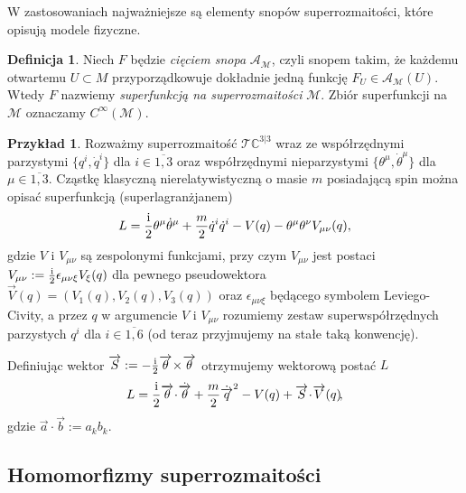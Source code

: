 \documentclass[11pt,a4paper]{report}
\theoremstyle{definition}
\newtheorem{example}[theorem]{Przykład}
\newtheorem{definition}[theorem]{Definicja}
\begin{document}
W zastosowaniach najważniejsze są elementy snopów superrozmaitości, które opisują modele fizyczne.

\begin{definition}
 Niech $F$ będzie \textit{cięciem snopa} $\mathcal{A_M}$, czyli snopem takim, że każdemu otwartemu $U \subset M$ przyporządkowuje dokładnie jedną funkcję $F_U \in \mathcal{A}_\mathcal{M} (U)$. Wtedy $F$ nazwiemy \textit{superfunkcją na superrozmaitości} $\mathcal{M}$. Zbiór superfunkcji na $\mathcal{M}$ oznaczamy $C^\infty(\mathcal{M})$.
\end{definition}

\begin{example}
\label{ex:casalbuoni}
Rozważmy superrozmaitość $\mathcal{T} \mathbb{C}^{3|3}$ wraz ze współrzędnymi parzystymi $\{ q^i, \dot{q}^i \}$ dla $i \in \overline{1,3}$ oraz współrzędnymi nieparzystymi $\{ \theta^\mu, \dot{\theta}^\mu \}$ dla $\mu \in \overline{1,3}$. Cząstkę klasyczną nierelatywistyczną o masie $m$ posiadającą spin można opisać \cite{casalbuoni} superfunkcją (superlagranżjanem) 
\begin{equation}
L = \frac{\rm i}{2} \theta^\mu \dot{\theta}^\mu + \frac{m}{2} \dot{q}^i \dot{q}^i   - V({q}) - \theta^\mu \theta^\nu V_{\mu \nu} ({q}),
\end{equation}
gdzie $V$ i $V_{\mu \nu}$ są zespolonymi funkcjami, przy czym $V_{\mu \nu}$ jest postaci $V_{\mu \nu} := \frac{\rm i}{2} \epsilon_{\mu \nu \xi} V_\xi (q)$ dla pewnego pseudowektora $\overrightarrow{V}(q) = (V_1(q), V_2(q), V_3(q))$ oraz $\epsilon_{\mu \nu \xi}$ będącego symbolem Leviego-Civity, a przez $q$ w argumencie $V$ i $V_{\mu \nu}$ rozumiemy zestaw superwspółrzędnych parzystych $q^i$ dla $i \in \overline{1,6}$ (od teraz przyjmujemy na stałe taką konwencję).

Definiując wektor $\overrightarrow{S} := - \frac{\rm i}{2} \overrightarrow{\theta}\! \times\! \overrightarrow{\theta}$ otrzymujemy wektorową postać $L$
\begin{equation}
L = \frac{\rm i}{2} \overrightarrow{\theta}\! \cdot\! \dot{\overrightarrow{\theta}} + \frac{m}{2} \dot{\overrightarrow{q}}^2 - V({q}) + \overrightarrow{S}\! \cdot\! \overrightarrow{V}(q)\!,
\end{equation}
gdzie $\overrightarrow{a}\! \cdot\! \overrightarrow{b} := a_k b_k.$
\end{example}

\subsection{Homomorfizmy superrozmaitości}
\end{document}
